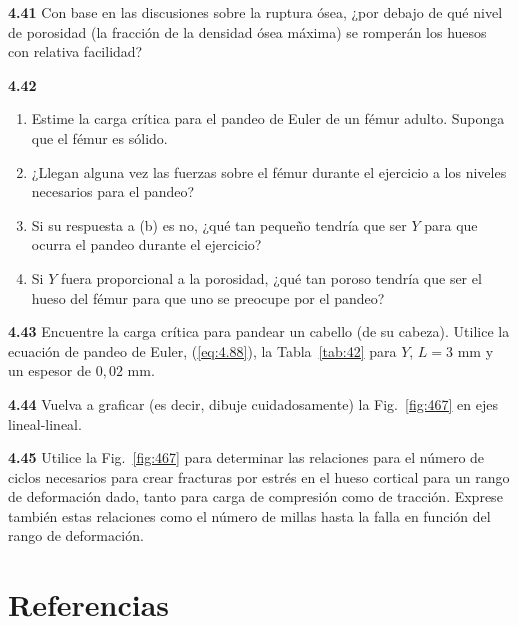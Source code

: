 \documentclass[12pt]{book}
\begin{document}
\textbf{4.41} Con base en las discusiones sobre la ruptura ósea, ¿por debajo de qué nivel de porosidad (la fracción de la densidad ósea máxima) se romperán los huesos con relativa facilidad?

\textbf{4.42}
\begin{enumerate}
  \item[(a)] Estime la carga crítica para el pandeo de Euler de un fémur adulto. Suponga que el fémur es sólido.
  \item[(b)] ¿Llegan alguna vez las fuerzas sobre el fémur durante el ejercicio a los niveles necesarios para el pandeo?
  \item[(c)] Si su respuesta a (b) es no, ¿qué tan pequeño tendría que ser $Y$ para que ocurra el pandeo durante el ejercicio?
  \item[(d)] Si $Y$ fuera proporcional a la porosidad, ¿qué tan poroso tendría que ser el hueso del fémur para que uno se preocupe por el pandeo?
\end{enumerate}

\textbf{4.43} Encuentre la carga crítica para pandear un cabello (de su cabeza). Utilice la ecuación de pandeo de Euler, (\ref{eq:4.88}), la Tabla~\ref{tab:42} para $Y$, $L = 3\text{ mm}$ y un espesor de $0,02\text{ mm}$.

\textbf{4.44} Vuelva a graficar (es decir, dibuje cuidadosamente) la Fig.~\ref{fig:467} en ejes lineal-lineal.

\textbf{4.45} Utilice la Fig.~\ref{fig:467} para determinar las relaciones para el número de ciclos necesarios para crear fracturas por estrés en el hueso cortical para un rango de deformación dado, tanto para carga de compresión como de tracción. Exprese también estas relaciones como el número de millas hasta la falla en función del rango de deformación.

\section*{Referencias}
\end{document}
